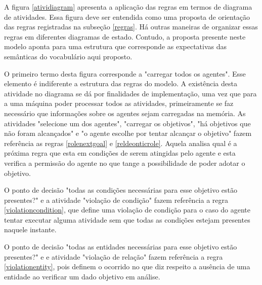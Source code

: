 A figura \ref{atividiagram} apresenta a aplicação das regras em termos de diagrama de atividades. Essa figura deve ser entendida como uma proposta de orientação das regras registradas na subseção \ref{regras}. Há outras maneiras de organizar essas regras em diferentes diagramas de estado. Contudo, a proposta presente neste modelo aponta para uma estrutura que corresponde as expectativas das semânticas do vocabulário aqui proposto.

O primeiro termo desta figura corresponde a "carregar todos os agentes". Esse elemento é indiferente a estrutura das regras do modelo. A existência desta atividade no diagrama se dá por finalidades de implementação, uma vez que para a uma máquina poder processar todos as atividades, primeiramente se faz necessário que informações sobre os agentes sejam carregadas na memória. As atividades "selecione um dos agentes", "carregar os objetivos", "há objetivos que não foram alcançados" e "o agente escolhe por tentar alcançar o objetivo" fazem referência as regras \ref{rolenextgoal} e \ref{reldeonticrole}. Aquela analisa qual é a próxima regra que esta em condições de serem atingidas pelo agente e esta verifica a permissão do agente no que tange a possibilidade de poder adotar o objetivo. 

O ponto de decisão "todas as condições necessárias para esse objetivo estão presentes?" e a atividade "violação de condição" fazem referência a regra \ref{violationcondition}, que define uma violação de condição para o caso do agente tentar executar alguma atividade sem que todas as condições estejam presentes naquele instante.

O ponto de decisão "todas as entidades necessárias para esse objetivo estão presentes?" e e atividade "violação de relação" fazem referência a regra \ref{violationentity}, pois definem o ocorrido no que diz respeito a ausência de uma entidade ao verificar um dado objetivo em análise. 


